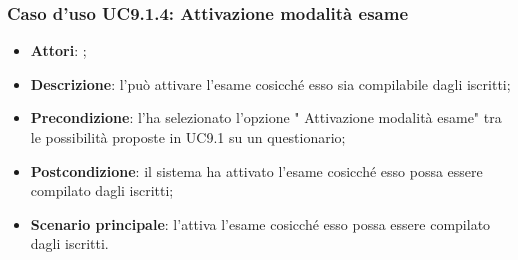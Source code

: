 		\subsubsection{Caso d'uso UC9.1.4: Attivazione modalità esame}
		\label{UC9.1.4}
		\begin{itemize}
			\item \textbf{Attori}: \uaupro;
			\item \textbf{Descrizione}: l'\uaupro può attivare l'esame cosicché esso sia compilabile dagli \uau iscritti;
			\item \textbf{Precondizione}: l'\uaupro ha selezionato l'opzione " Attivazione modalità esame" tra le possibilità proposte in UC9.1 su un questionario;
			\item \textbf{Postcondizione}: il sistema ha attivato l'esame cosicché esso possa essere compilato dagli \uaus iscritti;
			\item \textbf{Scenario principale}: l'\uaupro attiva l'esame cosicché esso possa essere compilato dagli \uaus iscritti.
		\end{itemize}
										
